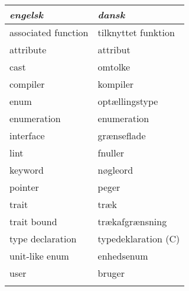 \documentclass{article}
\begin{document}
\begin{longtable}{l|l}
\emph{engelsk} & \emph{dansk}\\\hline
associated function & tilknyttet funktion \\
attribute & attribut \\
cast & omtolke \\
compiler & kompiler \\
enum & optællingstype \\
enumeration & enumeration \\
interface & grænseflade \\
lint & fnuller \\
keyword & nøgleord \\
pointer & peger \\
trait & træk \\
trait bound & trækafgrænsning \\
type declaration & typedeklaration (C) \\
unit-like enum & enhedsenum \\
user & bruger \\
\label{tab:ordbog}
\end{longtable}
\end{document}

